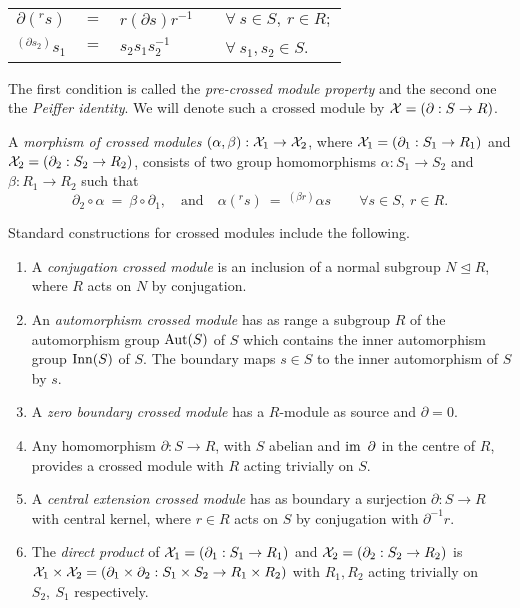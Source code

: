 \documentclass[a4paper,11pt]{article}
\theoremstyle{plain}
\theoremstyle{definition}
\begin{document}
\begin{center}
	\begin{tabular}{rclll}
	$\partial (^{r}s)$ 
		& $=$ 
			& $r(\partial s)r^{-1}$ 
				&   & $\forall~ s \in S,~ r \in R; $ \\
	$^{(\partial s_{2})}s_{1}$ 
		& $=$ 
			& $s_{2}s_{1}s_{2}^{-1}$ 
				&   & $\forall~ s_{1},s_{2} \in S$. 
	\end{tabular}
\end{center}

The first condition is called the \emph{pre-crossed module property} 
and the second one the \emph{Peiffer identity}. 
We will denote such a crossed module by $\mathcal{X} = (\partial : S \rightarrow R)$.

A \emph{morphism of crossed modules} 
$(\alpha ,\beta ) : \mathcal{X}_{1} \rightarrow \mathcal{X}_{2}$, 
where $\mathcal{X}_{1} = (\partial_{1} : S_{1} \rightarrow R_{1})$ 
and   $\mathcal{X}_{2} = (\partial_{2} : S_{2} \rightarrow R_{2})$, 
consists of two group homomorphisms $\alpha : S_{1} \rightarrow S_{2}$
and $\beta : R_{1} \rightarrow R_{2}$ such that 
$$ 
\partial_{2}\circ\alpha ~=~ \beta\circ\partial_{1}, 
\quad \mbox{and} \quad 
\alpha(^{r}s) ~=~ ^{(\beta r)}\alpha s 
\qquad
\forall s \in S,~ r \in R.
$$

Standard constructions for crossed modules include the following. 
\begin{enumerate}
\item 
A \emph{conjugation crossed module}  
is an inclusion of a normal subgroup $N \unlhd R$, 
where $R$ acts on $N$ by conjugation.
\item 
An \emph{automorphism crossed module}  
has as range a subgroup $R$ of the automorphism group $\mathrm{Aut}(S)$ of $S$ 
which contains the inner automorphism group $\mathrm{Inn}(S)$ of $S$. 
The boundary maps $s \in S$ to the inner automorphism of $S$ by $s$.
\item 
A \emph{zero boundary crossed module}  
has a $R$-module as source and $\partial = 0$.
\item 
Any homomorphism $\partial : S \to R$, with $S$ abelian 
and $\mathrm{im}\, ~\partial$ in the centre of $R$, 
provides a crossed module with $R$ acting trivially on $S$.
\item 
A \emph{central extension crossed module} 
has as boundary a surjection $\partial : S \to R$ with central kernel, 
where $r \in R$ acts on $S$ by conjugation with $\partial^{-1}r$.
\item 
The \emph{direct product} of  
$\mathcal{X}_1 = (\partial_1 : S_1 \to R_1)$ and $\mathcal{X}_2 = (\partial_2 : S_2 \to R_2)$ 
is $\mathcal{X}_1 \times \mathcal{X}_2 
= (\partial_1 \times \partial_2 : S_1 \times S_2 \to R_1 \times R_2)$ 
with $R_1, R_2$ acting trivially on $S_2,\ S_1$ respectively.
\end{enumerate}
\end{document}
